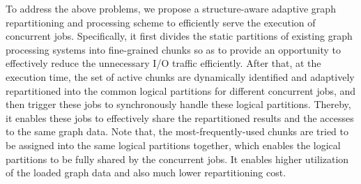 \documentclass[10pt,journal,compsoc]{IEEEtran}
\begin{document}
To address the above problems, we propose a structure-aware adaptive graph repartitioning and processing scheme to efficiently serve the execution of concurrent jobs.
Specifically, it first divides the static partitions of existing graph processing systems into fine-grained chunks so as to provide an opportunity to effectively reduce the unnecessary I/O traffic efficiently.
After that, at the execution time, the set of active chunks are dynamically identified and
adaptively repartitioned into the common logical partitions for different concurrent jobs, and then trigger these jobs to synchronously handle these logical partitions. Thereby, it enables these jobs to effectively share the repartitioned results and the accesses to the same graph data.
Note that, the most-frequently-used chunks are tried to be assigned into the same logical partitions together, which enables the logical partitions to be fully shared by the concurrent jobs. %
It enables higher utilization of the loaded graph data and also much lower repartitioning cost.

\vspace{-10pt}
\end{document}
